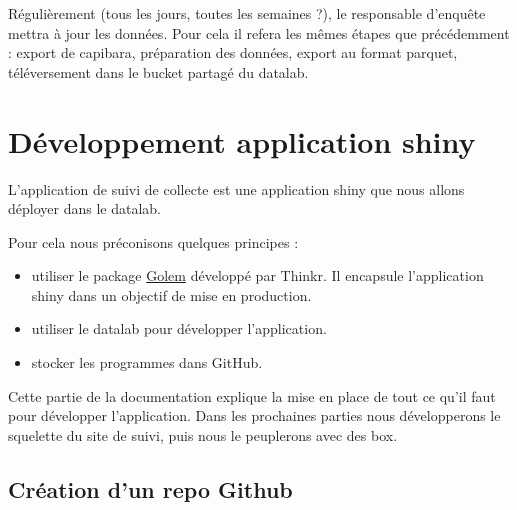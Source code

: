 \documentclass[
  letterpaper,
  DIV=11,
  numbers=noendperiod]{scrreprt}
\providecommand{\tightlist}{%
  \setlength{\itemsep}{0pt}\setlength{\parskip}{0pt}}\usepackage{longtable,booktabs,array}
\begin{document}
\begin{tcolorbox}[enhanced jigsaw, arc=.35mm, colbacktitle=quarto-callout-tip-color!10!white, breakable, colback=white, rightrule=.15mm, bottomrule=.15mm, coltitle=black, bottomtitle=1mm, left=2mm, opacityback=0, colframe=quarto-callout-tip-color-frame, leftrule=.75mm, toptitle=1mm, titlerule=0mm, title=\textcolor{quarto-callout-tip-color}{\faLightbulb}\hspace{0.5em}{Mise à jour des données}, toprule=.15mm, opacitybacktitle=0.6]
Régulièrement (tous les jours, toutes les semaines ?), le responsable
d'enquête mettra à jour les données. Pour cela il refera les mêmes
étapes que précédemment : export de capibara, préparation des données,
export au format parquet, téléversement dans le bucket partagé du
datalab.
\end{tcolorbox}


\hypertarget{duxe9veloppement-application-shiny}{%
\chapter{Développement application
shiny}\label{duxe9veloppement-application-shiny}}

L'application de suivi de collecte est une application shiny que nous
allons déployer dans le datalab.

Pour cela nous préconisons quelques principes :

\begin{itemize}
\tightlist
\item
  utiliser le package \href{https://github.com/ThinkR-open/golem}{Golem}
  développé par Thinkr. Il encapsule l'application shiny dans un
  objectif de mise en production.\\
\item
  utiliser le datalab pour développer l'application.\\
\item
  stocker les programmes dans GitHub.
\end{itemize}

Cette partie de la documentation explique la mise en place de tout ce
qu'il faut pour développer l'application. Dans les prochaines parties
nous développerons le squelette du site de suivi, puis nous le
peuplerons avec des box.

\hypertarget{cruxe9ation-dun-repo-github}{%
\section{Création d'un repo Github}\label{cruxe9ation-dun-repo-github}}
\end{document}
